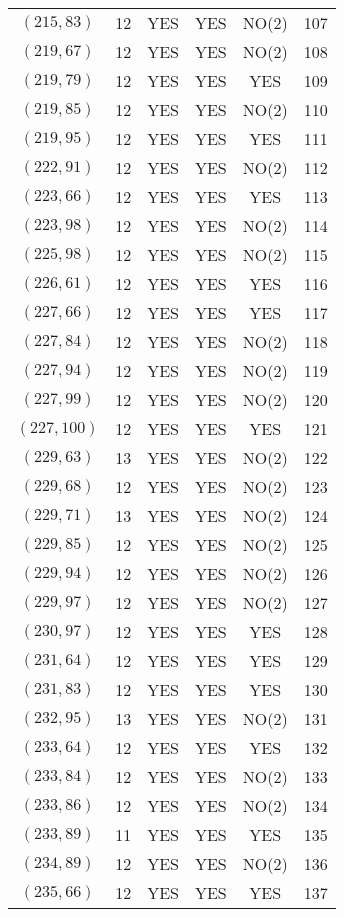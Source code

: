\begin{longtable}{|c|c|c|c|c|c|}
$(215, 83)$ & 12 & YES & YES & NO(2) & 107\\
$(219, 67)$ & 12 & YES & YES & NO(2) & 108\\
$(219, 79)$ & 12 & YES & YES & YES & 109\\
$(219, 85)$ & 12 & YES & YES & NO(2) & 110\\
$(219, 95)$ & 12 & YES & YES & YES & 111\\
$(222, 91)$ & 12 & YES & YES & NO(2) & 112\\
$(223, 66)$ & 12 & YES & YES & YES & 113\\
$(223, 98)$ & 12 & YES & YES & NO(2) & 114\\
$(225, 98)$ & 12 & YES & YES & NO(2) & 115\\
$(226, 61)$ & 12 & YES & YES & YES & 116\\
$(227, 66)$ & 12 & YES & YES & YES & 117\\
$(227, 84)$ & 12 & YES & YES & NO(2) & 118\\
$(227, 94)$ & 12 & YES & YES & NO(2) & 119\\
$(227, 99)$ & 12 & YES & YES & NO(2) & 120\\
$(227, 100)$ & 12 & YES & YES & YES & 121\\
$(229, 63)$ & 13 & YES & YES & NO(2) & 122\\
$(229, 68)$ & 12 & YES & YES & NO(2) & 123\\
$(229, 71)$ & 13 & YES & YES & NO(2) & 124\\
$(229, 85)$ & 12 & YES & YES & NO(2) & 125\\
$(229, 94)$ & 12 & YES & YES & NO(2) & 126\\
$(229, 97)$ & 12 & YES & YES & NO(2) & 127\\
$(230, 97)$ & 12 & YES & YES & YES & 128\\
$(231, 64)$ & 12 & YES & YES & YES & 129\\
$(231, 83)$ & 12 & YES & YES & YES & 130\\
$(232, 95)$ & 13 & YES & YES & NO(2) & 131\\
$(233, 64)$ & 12 & YES & YES & YES & 132\\
$(233, 84)$ & 12 & YES & YES & NO(2) & 133\\
$(233, 86)$ & 12 & YES & YES & NO(2) & 134\\
$(233, 89)$ & 11 & YES & YES & YES & 135\\
$(234, 89)$ & 12 & YES & YES & NO(2) & 136\\
$(235, 66)$ & 12 & YES & YES & YES & 137\\

\end{longtable}
